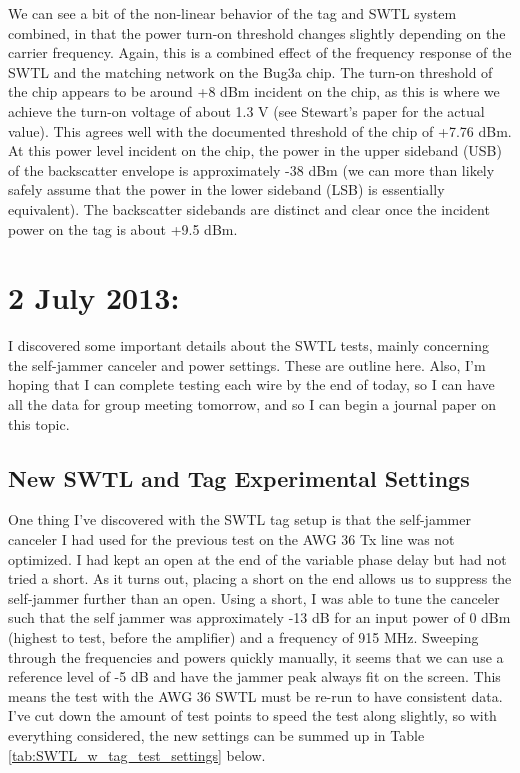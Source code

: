 \documentclass[12pt,onecolumn,titlepage]{article}
\begin{document}
We can see a bit of the non-linear behavior of the tag and SWTL system combined, in that the power turn-on threshold changes slightly depending on the carrier frequency. Again, this is a combined effect of the frequency response of the SWTL and the matching network on the Bug3a chip. The turn-on threshold of the chip appears to be around +8 dBm incident on the chip, as this is where we achieve the turn-on voltage of about 1.3 V (see Stewart's paper for the actual value). This agrees well with the documented threshold of the chip of +7.76 dBm. At this power level incident on the chip, the power in the upper sideband (USB) of the backscatter envelope is approximately -38 dBm (we can more than likely safely assume that the power in the lower sideband (LSB) is essentially equivalent). The backscatter sidebands are distinct and clear once the incident power on the tag is about +9.5 dBm.




\clearpage
\section{2 July 2013:}

\indent \indent I discovered some important details about the SWTL tests, mainly concerning the self-jammer canceler and power settings. These are outline here. Also, I'm hoping that I can complete testing each wire by the end of today, so I can have all the data for group meeting tomorrow, and so I can begin a journal paper on this topic.

\subsection{New SWTL and Tag Experimental Settings}
\indent \indent One thing I've discovered with the SWTL tag setup is that the self-jammer canceler I had used for the previous test on the AWG 36 Tx line was not optimized. I had kept an open at the end of the variable phase delay but had not tried a short. As it turns out, placing a short on the end allows us to suppress the self-jammer further than an open. Using a short, I was able to tune the canceler such that the self jammer was approximately -13 dB for an input power of 0 dBm (highest to test, before the amplifier) and a frequency of 915 MHz. Sweeping through the frequencies and powers quickly manually, it seems that we can use a reference level of -5 dB and have the jammer peak always fit on the screen. This means the test with the AWG 36 SWTL must be re-run to have consistent data. I've cut down the amount of test points to speed the test along slightly, so with everything considered, the new settings can be summed up in Table \ref{tab:SWTL_w_tag_test_settings} below.
\end{document}
